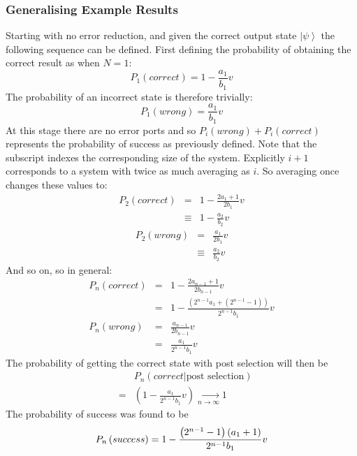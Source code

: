 \documentclass[aps,pra,twocolumn,superscriptaddress,numerical,floatfix]{revtex4-1}
\begin{document}
\subsubsection{Generalising Example Results}

Starting with no error reduction, and given the correct output state $\left|\psi\right\rangle $ the following sequence can be defined. First defining the probability of obtaining the correct result as when $N=1$:
\begin{equation}
P_{1}(correct)=1-\frac{a_{1}}{b_{1}}v
\end{equation}
The probability of an incorrect state is therefore trivially:
\begin{equation}
P_{1}(wrong)=\frac{a_{1}}{b_{1}}v
\end{equation}
At this stage there are no error ports and so $P_{i}(wrong)+P_{i}(correct)$ represents the probability of success as previously defined. Note that the subscript indexes the corresponding size of the system. Explicitly $i+1$ corresponds to a system with twice as much averaging as $i$.
So averaging once changes these values to:
\begin{eqnarray}
P_{2}(correct) & = & 1-\frac{2a_{1}+1}{2b_{1}}v\nonumber \\
& \equiv & 1-\frac{a_{2}}{b_{2}}v
\end{eqnarray}
\begin{eqnarray}
P_{2}(wrong) & = & \frac{a_{1}}{2b_{1}}v\nonumber \\
& \equiv & \frac{a_{2}}{b_{2}}v
\end{eqnarray}
And so on, so in general:
\begin{eqnarray}
P_{n}(correct) & = & 1-\frac{2a_{n-1}+1}{2b_{n-1}}v\nonumber \\
& = & 1-\frac{\left(2^{n-1}a_{1}+\left(2^{n-1}-1\right)\right)}{2^{n-1}b_{1}}v\\
P_{n}(wrong) & = & \frac{a_{n-1}}{2b_{n-1}}v\nonumber \\
& = & \frac{a_{1}}{2^{n-1}b_{1}}v
\end{eqnarray}
The probability of getting the correct state with post selection will then be
\begin{eqnarray}
&  & P_{n}\left(correct\left|\textrm{post selection}\right.\right)\nonumber \\
& = & \left(1-\frac{a_{1}}{2^{n-1}b_{1}}v\right)\xrightarrow[n\rightarrow\infty]{}1\label{eq:PcorrectGeneral}
\end{eqnarray}
The probability of success was found to be
\begin{equation}
P_{n}\left(success\right) =  1-\frac{\left(2^{n-1}-1\right)\left(a_{1}+1\right)}{2^{n-1}b_{1}}v\nonumber \\
\end{equation}
\end{document}
